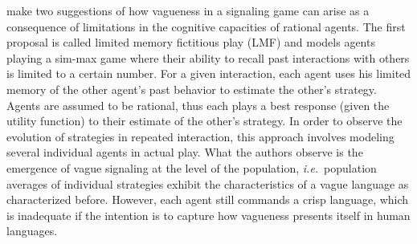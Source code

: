 \documentclass[a4paper]{article}
\begin{document}
\textcite{franke_vagueness_2011} make two suggestions of how vagueness in a signaling game can arise as a consequence of limitations in the cognitive capacities of rational agents.
The first proposal is called limited memory fictitious play (LMF) and models agents playing a sim-max game where their ability to recall past interactions with others is limited to a certain number.
For a given interaction, each agent uses his limited memory of the other agent's past behavior to estimate the other's strategy.
Agents are assumed to be rational, thus each plays a best response (given the utility function) to their estimate of the other's strategy.
In order to observe the evolution of strategies in repeated interaction, this approach involves modeling several individual agents in actual play.
What the authors observe is the emergence of vague signaling at the level of the population, \emph{i.e.}~population averages of individual strategies exhibit the characteristics of a vague language as characterized before.
However, each agent still commands a crisp language, which is inadequate if the intention is to capture how vagueness presents itself in human languages.
\end{document}

